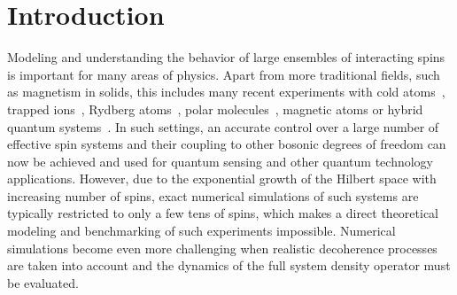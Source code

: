 \documentclass[pra,twocolumn,showpacs,preprintnumbers,amsmath,amssymb,superscriptaddress]{revtex4-1}
\begin{document}
\section{Introduction}
Modeling and understanding the behavior of large ensembles of interacting spins is important for many areas of physics. Apart from more traditional fields, such as magnetism in solids, this includes many recent experiments with cold atoms~\cite{Esteve2008,Appel2009,Riedel2010,SchleierSmith2010,Hosten2016,Cox2016,Pezze2018,Pedrozo2020,Szigeti2020}, trapped ions~\cite{Bollinger2012,Islam2013,Richerme2014,Bollinger2016,Zhang2017,Friis2018,Bruzewicz2019}, Rydberg atoms~\cite{Labuhn2016,Bernien2017,GuardadoSanchez2018,Madjarov2020,Browaeys2020,Scholl2020,Ebadi2020}, polar molecules~\cite{Bohn2017}, magnetic atoms \cite{Lepoutre2019,DePaz2013,Patscheider2020,Burdick2016} or hybrid quantum systems~\cite{Schuster2010,Kubo2010,Amsuss2011,Probst2013,Xiang2013,Kurizki2015,Angerer2018}.  In such settings, an accurate control over a large number of effective spin systems and their coupling to other bosonic degrees of freedom can now be achieved and used for quantum sensing and other quantum technology applications. However, due to the exponential growth of the Hilbert space with increasing number of spins, exact numerical simulations of such systems are typically restricted to only a few tens of spins, which makes a direct theoretical modeling and benchmarking of such experiments impossible. Numerical simulations become even more challenging when realistic decoherence processes are taken into account and the dynamics of the full system density operator must be evaluated.  
\end{document}
